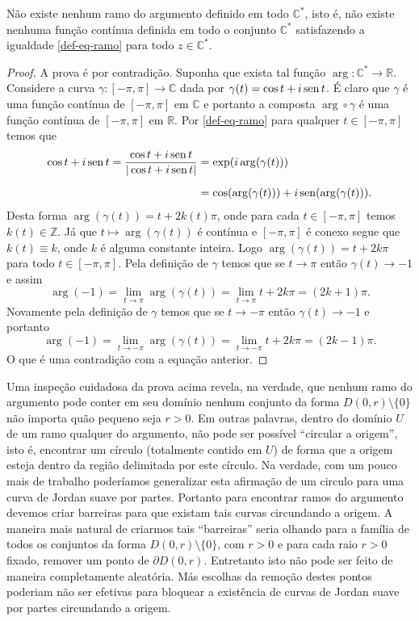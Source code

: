 \begin{proposicao}
Não existe nenhum ramo do argumento definido em todo $\mathbb{C}^{*}$, isto é,
não existe nenhuma função contínua definida em todo o conjunto $\mathbb{C}^{*}$
satisfazendo a igualdade \eqref{def-eq-ramo} para todo $z\in\mathbb{C}^{*}$.
\end{proposicao}

\begin{proof}
A prova é por contradição. Suponha que exista tal função $\arg:\mathbb{C}^{*}\to\mathbb{R}$. 
Considere a curva $\gamma:[-\pi,\pi]\to\mathbb{C}$ dada por 
$\gamma(t)=\cos t+i\operatorname{sen} t$. É claro que $\gamma$ é uma função contínua
de $[-\pi,\pi]$ em $\mathbb{C}$ e portanto a composta $\arg\circ \gamma$ é uma função 
contínua de $[-\pi,\pi]$ em $\mathbb{R}$. Por \eqref{def-eq-ramo} para qualquer 
$t\in [-\pi,\pi]$ temos que 
\begin{align*}
\cos t+i\operatorname{sen} t = \frac{\cos t+i\operatorname{sen} t}{|\cos t+i\operatorname{sen} t|}
&=
\exp(i\arg(\gamma(t)))
\\[0.2cm]
&=
\cos(\arg(\gamma(t)))+ i\operatorname{sen}(\arg(\gamma(t))).
\end{align*}
Desta forma $\arg(\gamma(t))=t+2k(t)\pi$, onde para cada $t\in [-\pi,\pi]$ 
temos $k(t)\in\mathbb{Z}$. Já que $t\longmapsto \arg(\gamma(t))$ é 
contínua e $[-\pi,\pi]$ é conexo segue que $k(t)\equiv k$, 
onde $k$ é alguma constante inteira. Logo $\arg(\gamma(t))=t+2k\pi$
para todo $t\in [-\pi,\pi]$. 
Pela definição de $\gamma$ temos que se $t\to \pi$ então $\gamma(t)\to -1$
e assim 
\[
\arg(-1) = \lim_{t\to \pi} \arg(\gamma(t)) = \lim_{t\to \pi} t+2k\pi = (2k+1)\pi.
\] 
Novamente pela definição de $\gamma$ temos que se $t\to-\pi$ então 
$\gamma(t)\to -1$ e portanto 
\[
\arg(-1) = \lim_{t\to -\pi} \arg(\gamma(t)) = \lim_{t\to -\pi} t+2k\pi = (2k-1)\pi.
\]
O que é uma contradição com a equação anterior.
\end{proof}

\bigskip 


Uma inspeção cuidadosa da prova acima revela, na verdade, que nenhum ramo do argumento 
pode conter em seu domínio nenhum conjunto da forma $D(0,r)\setminus\{0\}$ 
não importa quão pequeno 
seja $r>0$.
Em outras palavras, dentro do domínio $U$ de um ramo qualquer do argumento, não pode ser 
possível ``circular a origem'', isto é, encontrar um círculo (totalmente contido em $U$) 
de forma que a origem esteja dentro da região delimitada por este círculo. 
Na verdade, com um pouco mais de trabalho poderíamos generalizar esta afirmação de
um circulo para uma curva de Jordan suave por partes. Portanto para encontrar ramos
do argumento devemos criar barreiras para que existam tais curvas circundando a origem.
A maneira mais natural de criarmos tais ``barreiras''
seria olhando para a família de todos os conjuntos da 
forma $D(0,r)\setminus\{0\}$, com $r>0$ e para cada raio $r>0$ fixado, 
remover um ponto de $\partial D(0,r)$. Entretanto isto não pode ser feito 
de maneira completamente aleatória. Más escolhas da remoção destes pontos poderiam
não ser efetivas para bloquear a existência de curvas de Jordan suave por partes
circundando a origem. 

